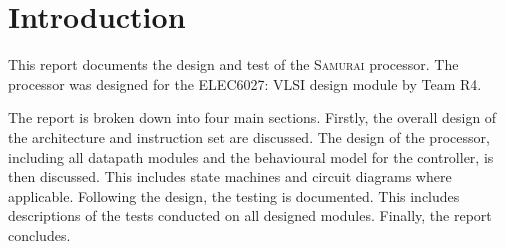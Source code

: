 

\chapter{Introduction}


This report documents the design and test of the \textsc{Samurai} processor. 
The processor was designed for the ELEC6027: VLSI design module by Team R4.

The report is broken down into four main sections.
Firstly, the overall design of the architecture and instruction set are discussed. 
The design of the processor, including all datapath modules and the behavioural model for the controller, is then discussed.
This includes state machines and circuit diagrams where applicable. 
Following the design, the testing is documented. 
This includes descriptions of the tests conducted on all designed modules. 
Finally, the report concludes. 

